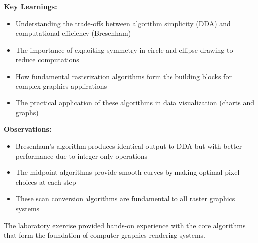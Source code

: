 \documentclass[12pt,a4paper]{article}
\begin{document}
\textbf{Key Learnings:}
\begin{itemize}
    \item Understanding the trade-offs between algorithm simplicity (DDA) and computational efficiency (Bresenham)
    \item The importance of exploiting symmetry in circle and ellipse drawing to reduce computations
    \item How fundamental rasterization algorithms form the building blocks for complex graphics applications
    \item The practical application of these algorithms in data visualization (charts and graphs)
\end{itemize}

\textbf{Observations:}
\begin{itemize}
    \item Bresenham's algorithm produces identical output to DDA but with better performance due to integer-only operations
    \item The midpoint algorithms provide smooth curves by making optimal pixel choices at each step
    \item These scan conversion algorithms are fundamental to all raster graphics systems
\end{itemize}

The laboratory exercise provided hands-on experience with the core algorithms that form the foundation of computer graphics rendering systems.
\end{document}
